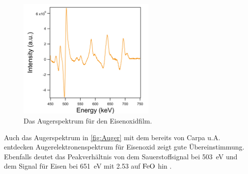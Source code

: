             \begin{figure}
                \centering
                \includegraphics[width=0.6\textwidth]{./content/pictures/FeO/2021_09_09_001_AES_FeO.png}
                \caption{Das Augerspektrum für den Eisenoxidfilm.}
                \label{fig:Auger}
            \end{figure}
            Auch das Augerspektrum in \autoref{fig:Auger} mit dem bereits von Carpa u.A. \cite{FeO_1} entdecken Augerelektronenspektrum für Eisenoxid zeigt gute Übereinstimmung.
            Ebenfalls deutet das Peakverhältnis von dem Sauerstoffsignal bei \SI{503}{\electronvolt} und dem Signal für Eisen bei \SI{651}{\electronvolt} mit \num{2.53} auf $\ce{FeO}$ hin \cite{FeO_1, Auger}.
        

